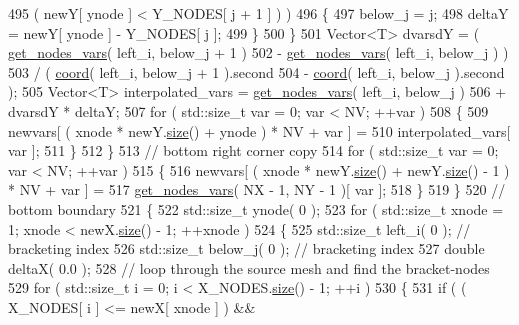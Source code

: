 \begin{DoxyCode}
495                ( newY[ ynode ] < Y\_NODES[ j + 1 ] ) )
496           \{
497             below\_j = j;
498             deltaY = newY[ ynode ] - Y\_NODES[ j ];
499           \}
500         \}
501         Vector<T> dvarsdY = ( \hyperlink{classLuna_1_1Mesh2D_ae91c7515960ecedf43e4ed3f411080a1}{get\_nodes\_vars}( left\_i, below\_j + 1 )
502                               - \hyperlink{classLuna_1_1Mesh2D_ae91c7515960ecedf43e4ed3f411080a1}{get\_nodes\_vars}( left\_i, below\_j ) )
503                            / ( \hyperlink{classLuna_1_1Mesh2D_add4d12155922731ccf59fe4454699eed}{coord}( left\_i, below\_j + 1 ).second
504                               - \hyperlink{classLuna_1_1Mesh2D_add4d12155922731ccf59fe4454699eed}{coord}( left\_i, below\_j ).second );
505         Vector<T> interpolated\_vars =   \hyperlink{classLuna_1_1Mesh2D_ae91c7515960ecedf43e4ed3f411080a1}{get\_nodes\_vars}( left\_i, below\_j )
506                                       + dvarsdY * deltaY;
507         \textcolor{keywordflow}{for} ( std::size\_t var = 0; var < NV; ++var )
508         \{
509           newvars[ ( xnode * newY.\hyperlink{classLuna_1_1Vector_ac9b6ed7a0df401728f27c193fbc8f4d8}{size}() + ynode ) * NV + var ] =
510                                                        interpolated\_vars[ var ];
511         \}
512       \}
513       \textcolor{comment}{// bottom right corner copy}
514       \textcolor{keywordflow}{for} ( std::size\_t var = 0; var < NV; ++var )
515       \{
516         newvars[ ( xnode * newY.\hyperlink{classLuna_1_1Vector_ac9b6ed7a0df401728f27c193fbc8f4d8}{size}() + newY.\hyperlink{classLuna_1_1Vector_ac9b6ed7a0df401728f27c193fbc8f4d8}{size}() - 1 ) * NV + var ] =
517         \hyperlink{classLuna_1_1Mesh2D_ae91c7515960ecedf43e4ed3f411080a1}{get\_nodes\_vars}( NX - 1, NY - 1 )[ var ];
518       \}
519     \}
520     \textcolor{comment}{// bottom boundary}
521     \{
522       std::size\_t ynode( 0 );
523       \textcolor{keywordflow}{for} ( std::size\_t xnode = 1; xnode < newX.\hyperlink{classLuna_1_1Vector_ac9b6ed7a0df401728f27c193fbc8f4d8}{size}() - 1; ++xnode )
524       \{
525         std::size\_t left\_i( 0 );  \textcolor{comment}{// bracketing index}
526         std::size\_t below\_j( 0 ); \textcolor{comment}{// bracketing index}
527         \textcolor{keywordtype}{double} deltaX( 0.0 );
528         \textcolor{comment}{// loop through the source mesh and find the bracket-nodes}
529         \textcolor{keywordflow}{for} ( std::size\_t i = 0; i < X\_NODES.\hyperlink{classLuna_1_1Vector_ac9b6ed7a0df401728f27c193fbc8f4d8}{size}() - 1; ++i )
530         \{
531           \textcolor{keywordflow}{if} ( ( X\_NODES[ i ] <= newX[ xnode ] ) &&

\end{DoxyCode}
